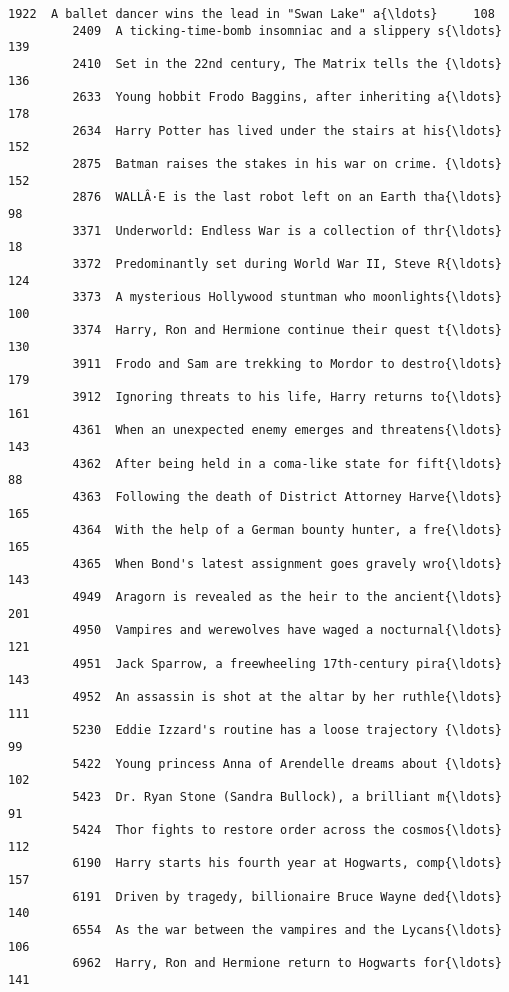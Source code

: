 \documentclass[11pt]{article}
\begin{document}
\begin{Verbatim}[commandchars=\\\{\}]
         1922  A ballet dancer wins the lead in "Swan Lake" a{\ldots}     108   
         2409  A ticking-time-bomb insomniac and a slippery s{\ldots}     139   
         2410  Set in the 22nd century, The Matrix tells the {\ldots}     136   
         2633  Young hobbit Frodo Baggins, after inheriting a{\ldots}     178   
         2634  Harry Potter has lived under the stairs at his{\ldots}     152   
         2875  Batman raises the stakes in his war on crime. {\ldots}     152   
         2876  WALLÂ·E is the last robot left on an Earth tha{\ldots}      98   
         3371  Underworld: Endless War is a collection of thr{\ldots}      18   
         3372  Predominantly set during World War II, Steve R{\ldots}     124   
         3373  A mysterious Hollywood stuntman who moonlights{\ldots}     100   
         3374  Harry, Ron and Hermione continue their quest t{\ldots}     130   
         3911  Frodo and Sam are trekking to Mordor to destro{\ldots}     179   
         3912  Ignoring threats to his life, Harry returns to{\ldots}     161   
         4361  When an unexpected enemy emerges and threatens{\ldots}     143   
         4362  After being held in a coma-like state for fift{\ldots}      88   
         4363  Following the death of District Attorney Harve{\ldots}     165   
         4364  With the help of a German bounty hunter, a fre{\ldots}     165   
         4365  When Bond's latest assignment goes gravely wro{\ldots}     143   
         4949  Aragorn is revealed as the heir to the ancient{\ldots}     201   
         4950  Vampires and werewolves have waged a nocturnal{\ldots}     121   
         4951  Jack Sparrow, a freewheeling 17th-century pira{\ldots}     143   
         4952  An assassin is shot at the altar by her ruthle{\ldots}     111   
         5230  Eddie Izzard's routine has a loose trajectory {\ldots}      99   
         5422  Young princess Anna of Arendelle dreams about {\ldots}     102   
         5423  Dr. Ryan Stone (Sandra Bullock), a brilliant m{\ldots}      91   
         5424  Thor fights to restore order across the cosmos{\ldots}     112   
         6190  Harry starts his fourth year at Hogwarts, comp{\ldots}     157   
         6191  Driven by tragedy, billionaire Bruce Wayne ded{\ldots}     140   
         6554  As the war between the vampires and the Lycans{\ldots}     106   
         6962  Harry, Ron and Hermione return to Hogwarts for{\ldots}     141   
         

\end{Verbatim}
\end{document}
